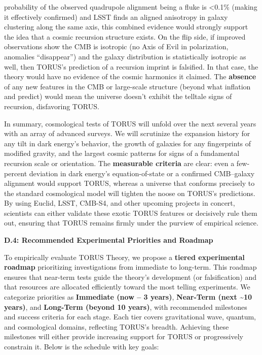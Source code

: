 \documentclass[
]{article}
\begin{document}
\begin{itemize}
\begin{itemize}
    probability of the observed quadrupole alignment being a fluke is
    \textless0.1\% (making it effectively confirmed) and LSST finds an
    aligned anisotropy in galaxy clustering along the same axis, this
    combined evidence would strongly support the idea that a cosmic
    recursion structure exists\hspace{0pt}. On the flip side, if
    improved observations show the CMB is isotropic (no Axis of Evil in
    polarization, anomalies ``disappear'') and the galaxy distribution
    is statistically isotropic as well, then TORUS's prediction of a
    recursion imprint is falsified\hspace{0pt}. In that case, the theory
    would have no evidence of the cosmic harmonics it claimed. The
    \textbf{absence} of any new features in the CMB or large-scale
    structure (beyond what inflation and \LambdaCDM predict) would mean the
    universe doesn't exhibit the telltale signs of recursion,
    disfavoring TORUS.
  \end{itemize}
\end{itemize}

In summary, cosmological tests of TORUS will unfold over the next
several years with an array of advanced surveys. We will scrutinize the
expansion history for any tilt in dark energy's behavior, the growth of
galaxies for any fingerprints of modified gravity, and the largest
cosmic patterns for signs of a fundamental recursion scale or
orientation. The \textbf{measurable criteria} are clear: even a
few-percent deviation in dark energy's equation-of-state or a confirmed
CMB--galaxy alignment would support TORUS, whereas a universe that
conforms precisely to the standard cosmological model will tighten the
noose on TORUS's predictions. By using Euclid, LSST, CMB-S4, and other
upcoming projects in concert, scientists can either validate these
exotic TORUS features or decisively rule them out, ensuring that TORUS
remains firmly under the purview of empirical science.

\textbf{D.4: Recommended Experimental Priorities and Roadmap}

To empirically evaluate TORUS Theory, we propose a \textbf{tiered
experimental roadmap} prioritizing investigations from immediate to
long-term. This roadmap ensures that near-term tests guide the theory's
development (or falsification) and that resources are allocated
efficiently toward the most telling experiments. We categorize
priorities as \textbf{Immediate (now -- 3 years)}, \textbf{Near-Term
(next \textasciitilde10 years)}, and \textbf{Long-Term (beyond 10
years)}, with recommended milestones and success criteria for each
stage. Each tier covers gravitational wave, quantum, and cosmological
domains, reflecting TORUS's breadth. Achieving these milestones will
either provide increasing support for TORUS or progressively constrain
it. Below is the schedule with key goals:
\end{document}
